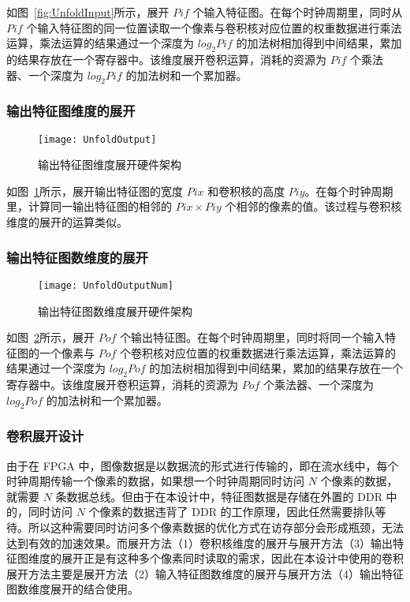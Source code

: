 如图~\ref{fig:UnfoldInput}所示，展开 $Pif$ 个输入特征图。在每个时钟周期里，同时从 $Pif$ 个输入特征图的同一位置读取一个像素与卷积核对应位置的权重数据进行乘法运算，乘法运算的结果通过一个深度为 $log_2{Pif}$ 的加法树相加得到中间结果，累加的结果存放在一个寄存器中。该维度展开卷积运算，消耗的资源为 $Pif$ 个乘法器、一个深度为 $log_2{Pif}$ 的加法树和一个累加器。

\subsubsection{输出特征图维度的展开}

\begin{figure}[!htbp]
    \centering
    \texttt{[image: UnfoldOutput]}
    \caption{输出特征图维度展开硬件架构}
    \label{fig:UnfoldOutput}
\end{figure}

如图~\ref{fig:UnfoldOutput}所示，展开输出特征图的宽度 $Pix$ 和卷积核的高度 $Piy$。在每个时钟周期里，计算同一输出特征图的相邻的 $Pix \times Piy$ 个相邻的像素的值。该过程与卷积核维度的展开的运算类似。

\subsubsection{输出特征图数维度的展开}

\begin{figure}[!htbp]
    \centering
    \texttt{[image: UnfoldOutputNum]}
    \caption{输出特征图数维度展开硬件架构}
    \label{fig:UnfoldOutputNum}
\end{figure}

如图~\ref{fig:UnfoldOutputNum}所示，展开 $Pof$ 个输出特征图。在每个时钟周期里，同时将同一个输入特征图的一个像素与 $Pof$ 个卷积核对应位置的权重数据进行乘法运算，乘法运算的结果通过一个深度为 $log_2{Pof}$ 的加法树相加得到中间结果，累加的结果存放在一个寄存器中。该维度展开卷积运算，消耗的资源为 $Pof$ 个乘法器、一个深度为 $log_2{Pof}$ 的加法树和一个累加器。

\subsubsection{卷积展开设计}

由于在 FPGA 中，图像数据是以数据流的形式进行传输的，即在流水线中，每个时钟周期传输一个像素的数据，如果想一个时钟周期同时访问 $N$ 个像素的数据，就需要 $N$ 条数据总线。但由于在本设计中，特征图数据是存储在外置的 DDR 中的，同时访问 $N$ 个像素的数据违背了 DDR 的工作原理，因此任然需要排队等待。所以这种需要同时访问多个像素数据的优化方式在访存部分会形成瓶颈，无法达到有效的加速效果。而展开方法（1）卷积核维度的展开与展开方法（3）输出特征图维度的展开正是有这种多个像素同时读取的需求，因此在本设计中使用的卷积展开方法主要是展开方法（2）输入特征图数维度的展开与展开方法（4）输出特征图数维度展开的结合使用。

